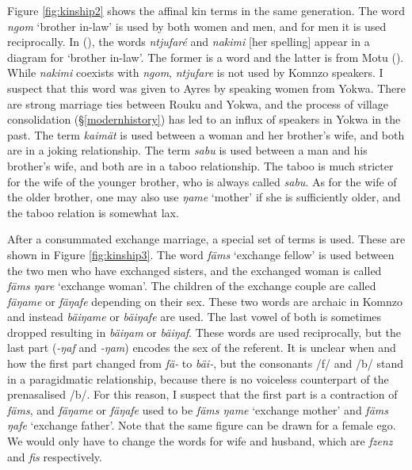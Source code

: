 Figure \ref{fig:kinship2} shows the affinal kin terms in the same generation. The word \emph{ngom} `brother in-law' is used by both women and men, and for men it is used reciprocally. In (\citealt[214]{Ayres:ws}), the words \emph{ntjufaré} and \emph{nakimi} [her spelling] appear in a  diagram for `brother in-law'. The former is a  word and the latter is from Motu (\citealt[107]{Turnerlister:1935motu}). While \emph{nakimi} coexists with \emph{ngom}, \emph{ntjufare} is not used by Komnzo speakers. I suspect that this word was given to Ayres by  speaking women from Yokwa. There are strong marriage ties between Rouku and Yokwa, and the process of village consolidation (\S{}\ref{modernhistory}) has led to an influx of  speakers in Yokwa in the past. The term \emph{kaimät} is used between a woman and her brother's wife, and both are in a joking relationship. The term \emph{sabu} is used between a man and his brother's wife, and both are in a taboo relationship. The taboo is much stricter for the wife of the younger brother, who is always called \emph{sabu}. As for the wife of the older brother, one may also use \emph{ŋame} `mother' if she is sufficiently older, and the taboo relation is somewhat lax.%

After a consummated exchange marriage, a special set of terms is used. These are shown in Figure \ref{fig:kinship3}. The word \emph{fäms} `exchange fellow' is used between the two men who have exchanged sisters, and the exchanged woman is called \emph{fäms ŋare} `exchange woman'. The children of the exchange couple are called \emph{fäŋame} or \emph{fäŋafe} depending on their sex. These two words are archaic in Komnzo and instead \emph{bäiŋame} or \emph{bäiŋafe} are used. The last vowel of both is sometimes dropped resulting in \emph{bäiŋam} or \emph{bäiŋaf}. These words are used reciprocally, but the last part (\emph{-ŋaf} and \emph{-ŋam}) encodes the sex of the referent. It is unclear when and how the first part changed from \emph{fä-} to \emph{bäi-}, but the consonants /f/ and /b/ stand in a paragidmatic relationship, because there is no voiceless counterpart of the prenasalised /b/. For this reason, I suspect that the first part is a contraction of \emph{fäms}, and \emph{fäŋame} or \emph{fäŋafe} used to be \emph{fäms ŋame} `exchange mother' and \emph{fäms ŋafe} `exchange father'. Note that the same figure can be drawn for a female ego. We would only have to change the words for wife and husband, which are \emph{fzenz} and \emph{fis} respectively.

